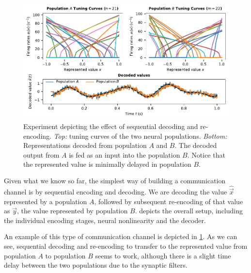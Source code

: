 \documentclass[10pt,letterpaper,oneside]{article}
\begin{document}
	\begin{figure}[p]
		\includegraphics[width=\textwidth]{media/two_populations_decoding_series.pdf}
		\caption{Experiment depicting the effect of sequential decoding and re-encoding. \emph{Top:} tuning curves of the two neural populations. \emph{Bottom:} Representations decoded from population $A$ and $B$. The decoded output from $A$ is fed as an input into the population $B$.  Notice that the represented value is minimally delayed in population $B$.}
		\label{fig:two_populations_decoding_series}
	\end{figure}
	
	Given what we know so far, the simplest way of building a communication channel is by sequential encoding and decoding. We are decoding the value $\hat{\vec x}$ represented by a population $A$, followed by subsequent re-encoding of that value as $\vec y$, the value represented by population $B$.  depicts the overall setup, including the individual encoding stages, neural nonlinearity and the decoder.
	
	An example of this type of communication channel is depicted in \cref{fig:two_populations_decoding_series}. As we can see, sequential decoding and re-encoding to transfer to the represented value from population $A$ to population $B$ seems to work, although there is a slight time delay between the two populations due to the synaptic filters.

\end{document}
